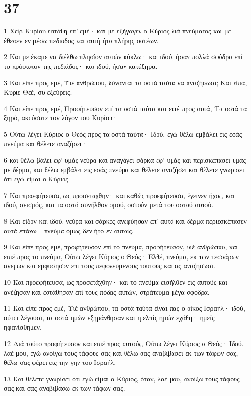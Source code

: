 \chapter{37}

\par 1 Χείρ Κυρίου εστάθη επ' εμέ· και με εξήγαγεν ο Κύριος διά πνεύματος και με έθεσεν εν μέσω πεδιάδος και αυτή ήτο πλήρης οστέων.
\par 2 Και με έκαμε να διέλθω πλησίον αυτών κύκλω· και ιδού, ήσαν πολλά σφόδρα επί το πρόσωπον της πεδιάδος· και ιδού, ήσαν κατάξηρα.
\par 3 Και είπε προς εμέ, Υιέ ανθρώπου, δύνανται τα οστά ταύτα να αναζήσωσι; Και είπα, Κύριε Θεέ, συ εξεύρεις.
\par 4 Και είπε προς εμέ, Προφήτευσον επί τα οστά ταύτα και ειπέ προς αυτά, Τα οστά τα ξηρά, ακούσατε τον λόγον του Κυρίου·
\par 5 Ούτω λέγει Κύριος ο Θεός προς τα οστά ταύτα· Ιδού, εγώ θέλω εμβάλει εις εσάς πνεύμα και θέλετε αναζήσει·
\par 6 και θέλω βάλει εφ' υμάς νεύρα και αναγάγει σάρκα εφ' υμάς και περισκεπάσει υμάς με δέρμα, και θέλω εμβάλει εις εσάς πνεύμα και θέλετε αναζήσει και θέλετε γνωρίσει ότι εγώ είμαι ο Κύριος.
\par 7 Και προεφήτευσα, ως προσετάχθην· και καθώς προεφήτευσα, έγεινεν ήχος, και ιδού, σεισμός, και τα οστά συνήλθον ομού, οστούν μετά του οστού αυτού.
\par 8 Και είδον και ιδού, νεύρα και σάρκες ανεφύησαν επ' αυτά και δέρμα περιεσκέπασεν αυτά επάνω· πνεύμα όμως δεν ήτο εν αυτοίς.
\par 9 Και είπε προς εμέ, προφήτευσον επί το πνεύμα, προφήτευσον, υιέ ανθρώπου, και ειπέ προς το πνεύμα, Ούτω λέγει Κύριος ο Θεός· Ελθέ, πνεύμα, εκ των τεσσάρων ανέμων και εμφύσησον επί τους πεφονευμένους τούτους και ας αναζήσωσι.
\par 10 Και προεφήτευσα, ως προσετάχθην· και το πνεύμα εισήλθεν εις αυτούς και ανέζησαν και εστάθησαν επί τους πόδας αυτών, στράτευμα μέγα σφόδρα.
\par 11 Και είπε προς εμέ, Υιέ ανθρώπου, τα οστά ταύτα είναι πας ο οίκος Ισραήλ· ιδού, ούτοι λέγουσι, τα οστά ημών εξηράνθησαν και η ελπίς ημών εχάθη· ημείς ηφανίσθημεν.
\par 12 Διά τούτο προφήτευσον και ειπέ προς αυτούς, Ούτω λέγει Κύριος ο Θεός· Ιδού, λαέ μου, εγώ ανοίγω τους τάφους σας και θέλω σας αναβιβάσει εκ των τάφων σας, θέλω σας φέρει εις την γην του Ισραήλ.
\par 13 Και θέλετε γνωρίσει ότι εγώ είμαι ο Κύριος, όταν, λαέ μου, ανοίξω τους τάφους σας και σας αναβιβάσω εκ των τάφων σας.
